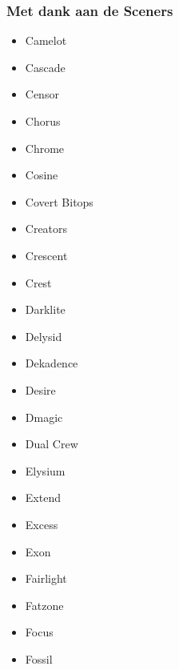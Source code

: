 
\begin{frame}[noframenumbering]
\frametitle{Met dank aan de Sceners}

\begin{multicols}{3}
\begin{itemize}
\item Camelot
\item Cascade
\item Censor
\item Chorus
\item Chrome
\item Cosine
\item Covert Bitops
\item Creators
\item Crescent
\item Crest
\item Darklite
\item Delysid
\item Dekadence
\item Desire
\item Dmagic
\item Dual Crew
\item Elysium
\item Extend
\item Excess
\item Exon
\item Fairlight
\item Fatzone
\item Focus
\item Fossil
\end{itemize}
\end{multicols}

\end{frame}


